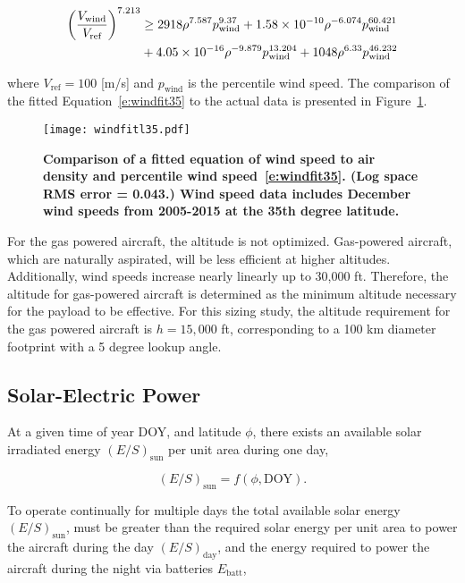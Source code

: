 \documentclass[]{aiaa-tc}%
\begin{document}
\begin{align}
    \left(\frac{V_{\text{wind}}}{V_{\text{ref}}}\right)^{7.213} &\geq 2918\rho^{7.587}p_{\text{wind}}^{9.37} + \num{1.58d-10}\rho^{-6.074}p_{\text{wind}}^{60.421} \nonumber \\
    \label{e:windfit35}
    &+ \num{4.05d-16}\rho^{-9.879}p_{\text{wind}}^{13.204} + 1048\rho^{6.33}p_{\text{wind}}^{46.232}
\end{align}

where $V_{\text{ref}} = 100$ [m/s] and $p_{\text{wind}}$ is the percentile wind speed. The comparison of the fitted Equation~\eqref{e:windfit35} to the actual data is presented in Figure~\ref{f:windfitl35}. 

\begin{figure}[H]
	\begin{center}
	\texttt{[image: windfitl35.pdf]}
    \caption{\textbf{Comparison of a fitted equation of wind speed to air density and percentile wind speed~\eqref{e:windfit35}. (Log space RMS error = 0.043.) Wind speed data includes December wind speeds from 2005-2015 at the 35th degree latitude.}}
	\label{f:windfitl35}
	\end{center}
\end{figure}

For the gas powered aircraft, the altitude is not optimized.  
Gas-powered aircraft, which are naturally aspirated, will be less efficient at higher altitudes.  
Additionally, wind speeds increase nearly linearly up to 30,000 ft.  
Therefore, the altitude for gas-powered aircraft is determined as the minimum altitude necessary for the payload to be effective.\cite{orion}
For this sizing study, the altitude requirement for the gas powered aircraft is $h=15,000$ ft, corresponding to a 100 km diameter footprint with a 5 degree lookup angle. 

\subsection{Solar-Electric Power}

At a given time of year DOY, and latitude $\phi$, there exists an available solar irradiated energy $(E/S)_{\text{sun}}$ per unit area during one day,

\begin{equation}
    \label{e:solarfunc}
    (E/S)_{\text{sun}} = f(\phi, \text{DOY}).
\end{equation}

To operate continually for multiple days the total available solar energy $(E/S)_{\text{sun}}$, must be greater than the required solar energy per unit area to power the aircraft during the day $(E/S)_{\text{day}}$, and the energy required to power the aircraft during the night via batteries $E_{\text{batt}}$,\cite{solartech}
\end{document}
